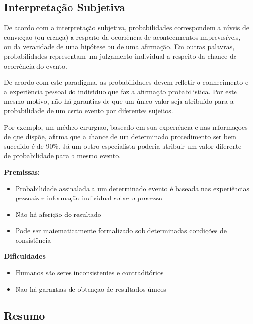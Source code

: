 \documentclass[
]{book}
\providecommand{\tightlist}{%
  \setlength{\itemsep}{0pt}\setlength{\parskip}{0pt}}
\theoremstyle{definition}
\theoremstyle{definition}
\theoremstyle{definition}
\theoremstyle{remark}
\begin{document}
\hypertarget{interpretauxe7uxe3o-subjetiva}{%
\subsection*{Interpretação Subjetiva}\label{interpretauxe7uxe3o-subjetiva}}

De acordo com a interpretação subjetiva, probabilidades correspondem a níveis de convicção (ou crença) a respeito da ocorrência de acontecimentos imprevisíveis, ou da veracidade de uma hipótese ou de uma afirmação. Em outras palavras, probabilidades representam um julgamento individual a respeito da chance de ocorrência do evento.

De acordo com este paradigma, as probabilidades devem refletir o conhecimento e a experiência pessoal do indivíduo que faz a afirmação probabilística. Por este mesmo motivo, não há garantias de que um único valor seja atribuído para a probabilidade de um certo evento por diferentes sujeitos.

Por exemplo, um médico cirurgião, baseado em sua experiência e nas informações de que dispõe, afirma que a chance de um determinado procedimento ser bem sucedido é de 90\%. Já um outro especialista poderia atribuir um valor diferente de probabilidade para o mesmo evento.

\textbf{Premissas:}

\begin{itemize}
\tightlist
\item
  Probabilidade assinalada a um determinado evento é baseada nas experiências pessoais e informação individual sobre o processo\\
\item
  Não há aferição do resultado\\
\item
  Pode ser matematicamente formalizado sob determinadas condições de consistência
\end{itemize}

\textbf{Dificuldades}

\begin{itemize}
\tightlist
\item
  Humanos são seres inconsistentes e contraditórios\\
\item
  Não há garantias de obtenção de resultados únicos
\end{itemize}

\hypertarget{resumo}{%
\subsection*{Resumo}\label{resumo}}
\end{document}
